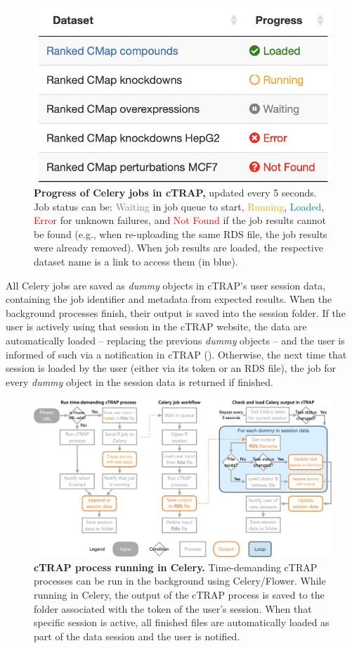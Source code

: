 \begin{figure}[!h]
  \includegraphics[width=.5\textwidth]{images/ctrap/job-progress}
  \centering
  \caption[Progress of Celery jobs in cTRAP]{\textbf{Progress of Celery jobs in cTRAP,} updated every 5 seconds. Job status can be: \textcolor{gray}{Waiting} in job queue to start, \textcolor{orange}{Running}, \textcolor{teal}{Loaded}, \textcolor{red}{Error} for unknown failures, and \textcolor{red}{Not Found} if the job results cannot be found (e.g., when re-uploading the same RDS file, the job results were already removed). When job results are loaded, the respective dataset name is a link to access them (in blue).}
  \label{fig:job-progress}
\end{figure}

All Celery jobs are saved as \emph{dummy} objects in cTRAP's user session data, containing the job identifier and metadata from expected results. When the background processes finish, their output is saved into the session folder. If the user is actively using that session in the cTRAP website, the data are automatically loaded -- replacing the previous \emph{dummy} objects -- and the user is informed of such via a notification in cTRAP (). Otherwise, the next time that session is loaded by the user (either via its token or an RDS file), the job for every \emph{dummy} object in the session data is returned if finished.

\begin{figure}[!htb]
  \includegraphics[width=\textwidth]{images/ctrap/celery-job}
  \centering
  \caption[cTRAP process running in Celery]{\textbf{cTRAP process running in Celery.} Time-demanding cTRAP processes can be run in the background using Celery/Flower. While running in Celery, the output of the cTRAP process is saved to the folder associated with the token of the user's session. When that specific session is active, all finished files are automatically loaded as part of the data session and the user is notified.}
  \label{fig:ctrap-celery}
\end{figure}

